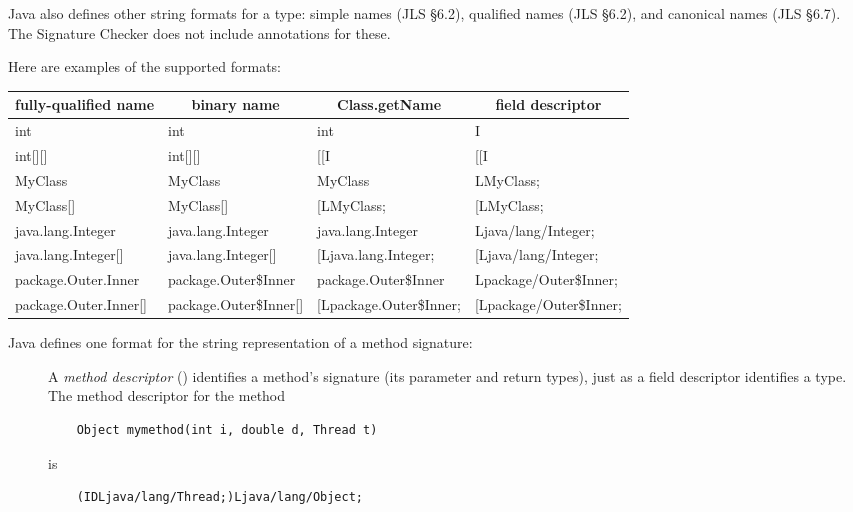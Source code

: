 Java also defines other string formats for a type: simple
names (JLS \S 6.2), qualified names (JLS \S 6.2), and canonical
names (JLS \S 6.7).  The Signature Checker does not include annotations
for these.

Here are examples of the supported formats:

\begin{center}
\begin{tabular}{|l|l|l|l|}
\hline
\multicolumn{1}{|c|}{fully-qualified name} & \multicolumn{1}{c|}{binary name} & \multicolumn{1}{c|}{Class.getName} & \multicolumn{1}{c|}{field descriptor} \\ \hline
int &                   int &                    int &                     I \\
int[][] &               int[][] &                [[I &                     [[I \\
MyClass &               MyClass &                MyClass &                 LMyClass; \\
MyClass[] &             MyClass[] &              [LMyClass; &              [LMyClass; \\
java.lang.Integer &     java.lang.Integer &      java.lang.Integer &       Ljava/lang/Integer; \\
java.lang.Integer[] &   java.lang.Integer[] &    [Ljava.lang.Integer; &    [Ljava/lang/Integer; \\
package.Outer.Inner &   package.Outer\$Inner &   package.Outer\$Inner &   Lpackage/Outer\$Inner; \\
package.Outer.Inner[] & package.Outer\$Inner[] & [Lpackage.Outer\$Inner; & [Lpackage/Outer\$Inner; \\
\hline
\end{tabular}
\end{center}

Java defines one format for the string representation of a method signature:

\begin{description}

\item[]
  A \emph{method descriptor} () identifies a method's signature (its parameter and return
  types), just as a field descriptor identifies a 
  type.   The method descriptor for the method
\begin{Verbatim}
    Object mymethod(int i, double d, Thread t)
\end{Verbatim}
\noindent is
\begin{Verbatim}
    (IDLjava/lang/Thread;)Ljava/lang/Object;
\end{Verbatim}

\end{description}


